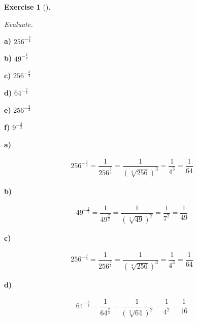 \documentclass[
  letterpaper,
  DIV=11,
  numbers=noendperiod]{scrreprt}
\theoremstyle{definition}
\newtheorem{exercise}{Exercise}[chapter]
\theoremstyle{remark}
\begin{document}
\begin{exercise}[]\protect\hypertarget{exr-u2-19}{}\label{exr-u2-19}

\emph{Evaluate.}

\textbf{a)} \(\displaystyle 256^{-\frac{3}{4}}\)

\textbf{b)} \(\displaystyle 49^{-\frac{2}{2}}\)

\textbf{c)} \(\displaystyle 256^{-\frac{3}{4}}\)

\textbf{d)} \(\displaystyle 64^{-\frac{2}{3}}\)

\textbf{e)} \(\displaystyle 256^{-\frac{3}{4}}\)

\textbf{f)} \(\displaystyle 9^{-\frac{2}{2}}\)

\begin{tcolorbox}[enhanced jigsaw, opacitybacktitle=0.6, coltitle=black, arc=.35mm, colframe=quarto-callout-tip-color-frame, colback=white, bottomrule=.15mm, left=2mm, colbacktitle=quarto-callout-tip-color!10!white, titlerule=0mm, opacityback=0, title=\textcolor{quarto-callout-tip-color}{\faLightbulb}\hspace{0.5em}{🔍 View Solutions}, leftrule=.75mm, breakable, rightrule=.15mm, bottomtitle=1mm, toptitle=1mm, toprule=.15mm]

\textbf{a)}

\[
\begin{aligned}
256^{-\frac{3}{4}} = \dfrac{1}{256^{\frac{3}{4}}}= \dfrac{1}{\left(\sqrt[4]{256}\right)^{3}}= \dfrac{1}{4^{3}} = \dfrac{1}{64}
\end{aligned}
\]

\textbf{b)}

\[
\begin{aligned}
49^{-\frac{2}{2}} = \dfrac{1}{49^{\frac{2}{2}}}= \dfrac{1}{\left(\sqrt[2]{49}\right)^{2}}= \dfrac{1}{7^{2}} = \dfrac{1}{49}
\end{aligned}
\]

\textbf{c)}

\[
\begin{aligned}
256^{-\frac{3}{4}} = \dfrac{1}{256^{\frac{3}{4}}}= \dfrac{1}{\left(\sqrt[4]{256}\right)^{3}}= \dfrac{1}{4^{3}} = \dfrac{1}{64}
\end{aligned}
\]

\textbf{d)}

\[
\begin{aligned}
64^{-\frac{2}{3}} = \dfrac{1}{64^{\frac{2}{3}}}= \dfrac{1}{\left(\sqrt[3]{64}\right)^{2}}= \dfrac{1}{4^{2}} = \dfrac{1}{16}
\end{aligned}
\]


\end{tcolorbox}
\end{exercise}
\end{document}
